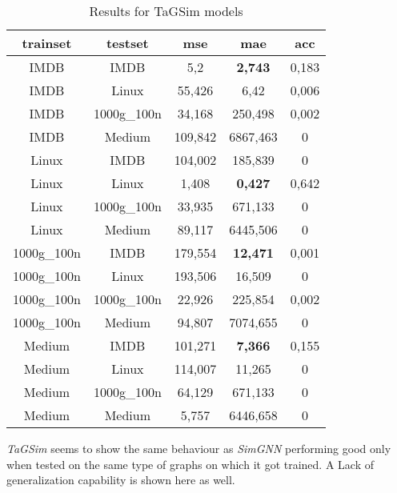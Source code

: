 \documentclass[../Thesis.tex]{subfiles}
\begin{document}
	\begin{table}[H]
		\centering
		\setlength\tabcolsep{4pt}
		\renewcommand{\arraystretch}{1.2}
		\begin{tabular}{c|c|c|c|c}
			\toprule
			\textbf{trainset} & \textbf{testset} & \textbf{mse} & \textbf{mae} & \textbf{acc} \\
			\midrule
IMDB & IMDB & 5,2 & \textbf{2,743} & 0,183 \\
IMDB & Linux & 55,426 & 6,42 & 0,006 \\
IMDB & 1000g\_100n & 34,168 & 250,498 & 0,002 \\
IMDB & Medium & 109,842 & 6867,463 & 0 \\ \midrule
Linux & IMDB & 104,002 & 185,839 & 0 \\
Linux & Linux & 1,408 & \textbf{0,427} & 0,642 \\
Linux & 1000g\_100n & 33,935 & 671,133 & 0 \\
Linux & Medium & 89,117 & 6445,506 & 0 \\ \midrule
1000g\_100n & IMDB & 179,554 & \textbf{12,471} & 0,001 \\
1000g\_100n & Linux & 193,506 & 16,509 & 0 \\
1000g\_100n & 1000g\_100n & 22,926 & 225,854 & 0,002 \\
1000g\_100n & Medium & 94,807 & 7074,655 & 0 \\ \midrule
Medium & IMDB & 101,271 & \textbf{7,366} & 0,155 \\
Medium & Linux & 114,007 & 11,265 & 0 \\
Medium & 1000g\_100n & 64,129 & 671,133 & 0 \\
Medium & Medium & 5,757 & 6446,658 & 0 \\
			\bottomrule
		\end{tabular}
		\caption{Results for TaGSim models}
		\label{table:tagsim}
	\end{table}
	
	\emph{TaGSim} seems to show the same behaviour as \emph{SimGNN} performing good only when tested on the same type of graphs on which it got trained. A Lack of generalization capability is shown here as well.
	
\end{document}
